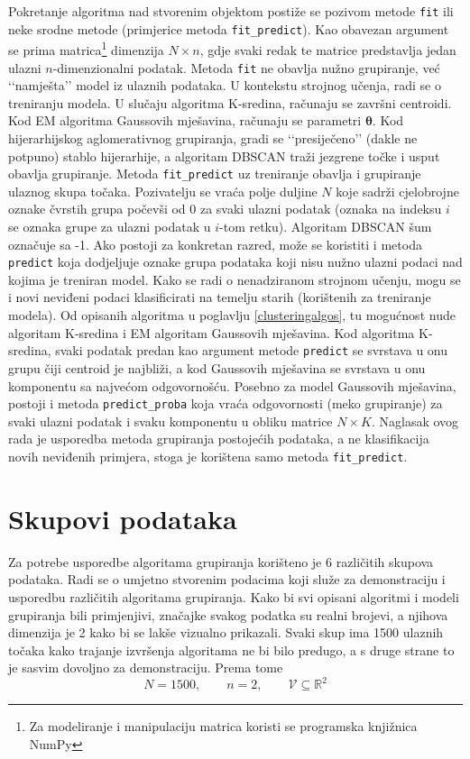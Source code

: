 \documentclass[times, utf8, zavrsni]{fer}
\begin{document}
Pokretanje algoritma nad stvorenim objektom postiže se pozivom metode \texttt{fit} ili neke srodne metode (primjerice metoda \texttt{fit\_predict}). Kao obavezan argument se prima matrica\footnote{Za modeliranje i manipulaciju matrica koristi se programska knjižnica NumPy} dimenzija $N \times n$, gdje svaki redak te matrice predstavlja jedan ulazni $n$-dimenzionalni podatak. Metoda \texttt{fit} ne obavlja nužno grupiranje, već ‘‘namješta’’ model iz ulaznih podataka. U kontekstu strojnog učenja, radi se o treniranju modela. U slučaju algoritma K-sredina, računaju se završni centroidi. Kod EM algoritma Gaussovih mješavina, računaju se parametri $\boldsymbol{\theta}$. Kod hijerarhijskog aglomerativnog grupiranja, gradi se ‘‘presiječeno’’ (dakle ne potpuno) stablo hijerarhije, a algoritam DBSCAN traži jezgrene točke i usput obavlja grupiranje. Metoda \texttt{fit\_predict} uz treniranje obavlja i grupiranje ulaznog skupa točaka. Pozivatelju se vraća polje duljine $N$ koje sadrži cjelobrojne oznake čvrstih grupa počevši od 0 za svaki ulazni podatak (oznaka na indeksu $i$ se oznaka grupe za ulazni podatak u $i$-tom retku). Algoritam DBSCAN šum označuje sa -1. Ako postoji za konkretan razred, može se koristiti i metoda \texttt{predict} koja dodjeljuje oznake grupa podataka koji nisu nužno ulazni podaci nad kojima je treniran model. Kako se radi o nenadziranom strojnom učenju, mogu se i novi neviđeni podaci klasificirati na temelju starih (korištenih za treniranje modela). Od opisanih algoritma u poglavlju \ref{clusteringalgos}, tu mogućnost nude algoritam K-sredina i EM algoritam Gaussovih mješavina. Kod algoritma K-sredina, svaki podatak predan kao argument metode \texttt{predict} se svrstava u onu grupu čiji centroid je najbliži, a kod Gaussovih mješavina se svrstava u onu komponentu sa najvećom odgovornošću. Posebno za model Gaussovih mješavina, postoji i metoda \texttt{predict\_proba} koja vraća odgovornosti (meko grupiranje) za svaki ulazni podatak i svaku komponentu u obliku matrice $N \times K$. Naglasak ovog rada je usporedba metoda grupiranja postojećih podataka, a ne klasifikacija novih neviđenih primjera, stoga je korištena samo metoda \texttt{fit\_predict}.

\section{Skupovi podataka}
Za potrebe usporedbe algoritama grupiranja korišteno je 6 različitih skupova podataka. Radi se o umjetno stvorenim podacima koji služe za demonstraciju i usporedbu različitih algoritama grupiranja. Kako bi svi opisani algoritmi i modeli grupiranja bili primjenjivi, značajke svakog podatka su realni brojevi, a njihova dimenzija je 2 kako bi se lakše vizualno prikazali. Svaki skup ima 1500 ulaznih točaka kako trajanje izvršenja algoritama ne bi bilo predugo, a s druge strane to je sasvim dovoljno za demonstraciju. Prema tome
\[N = 1500, \qquad n = 2, \qquad \mathcal{V} \subseteq \mathbb{R}^2\]
\end{document}
